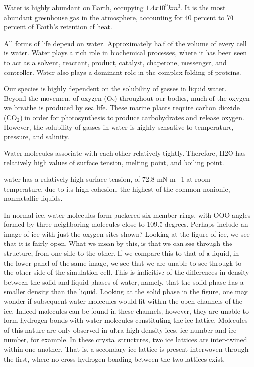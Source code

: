 Water is highly abundant on Earth, occupying
$1.4x10^{9} km^{3}$.\cite{2-4} It is the most abundant greenhouse gas
in the atmosphere, accounting for 40 percent to 70 percent of Earth's
retention of heat.

All forms of life depend on water.\cite{5,6} Approximately half of the
volume of every cell is water.\cite{7} Water plays a rich role in
biochemical processes, where it has been seen to act as a solvent,
reactant, product, catalyst, chaperone, messenger, and
controller. Water also plays a dominant role in the complex folding of
proteins.

Our species is highly dependent on the solubility of gasses in liquid
water. Beyond the movement of oxygen (O$_{2}$) throughout
our bodies, much of the oxygen we breathe is produced by sea
life. These marine plants require carbon dioxide
(CO$_{2}$) in order for photosynthesis to produce
carbohydrates and release oxygen. However, the solubility of gasses in
water is highly sensative to temperature, pressure, and salinity. 

Water molecules associate with each other relatively
tightly. Therefore, H2O has relatively high values of surface tension,
melting point, and boiling point.

water has a relatively high surface tension, of 72.8 mN m−1 at room
temperature, due to its high cohesion, the highest of the common
nonionic, nonmetallic liquids.

In normal ice, water molecules form puckered six member rings, with
OOO angles formed by three neighboring molecules close to 109.5
degrees. Perhaps include an image of ice with just the oxygen sites
shown? Looking at the figure of ice, we see that it is fairly
open. What we mean by this, is that we can see through the structure,
from one side to the other. If we compare this to that of a liquid, in
the lower panel of the same image, we see that we are unable to see
through to the other side of the simulation cell. This is indicitive
of the differences in density between the solid and liquid phases of
water, namely, that the solid phase has a smaller density than the
liquid. Looking at the solid phase in the figure, one may wonder if
subsequent water molecules would fit within the open channels of the
ice. Indeed molecules can be found in these channels, however, they
are unable to form hydrogen bonds with water molecules constituting
the ice lattice. Molecules of this nature are only observed in
ultra-high density ices, ice-number and ice-number, for example. In
these crystal structures, two ice lattices are inter-twined within one
another. That is, a secondary ice lattice is present interwoven
through the first, where no cross hydrogen bonding between the two
lattices exist.

